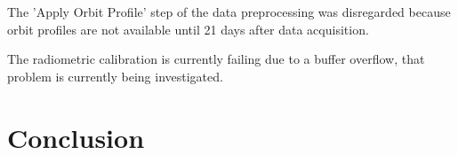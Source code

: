 \documentclass[conference]{IEEEtran}
\begin{document}
	The 'Apply Orbit Profile' step of the data preprocessing was disregarded because orbit profiles are not available until 21 days after data acquisition.
	
	The radiometric calibration is currently failing due to a buffer overflow, that problem is currently being investigated.
	


	\section{Conclusion}
	





	\nocite{*}
	\printbibliography
	
\end{document}
